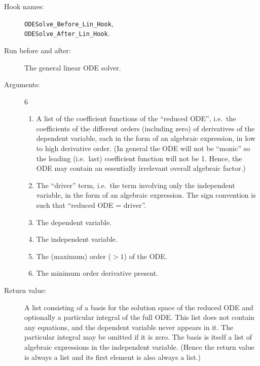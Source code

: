 \begin{description}
\item[Hook names:] \texttt{ODESolve\_Before\_Lin\_Hook},\\
\texttt{ODESolve\_After\_Lin\_Hook}.
\item[Run before and after:] The general linear ODE solver.
\item[Arguments:] 6
\begin{enumerate}
\item A list of the coefficient functions of the ``reduced ODE'',
i.e.\ the coefficients of the different orders (including zero) of
derivatives of the dependent variable, each in the form of an
algebraic expression, in low to high derivative order.  (In general
the ODE will not be ``monic'' so the leading (i.e.\ last) coefficient
function will not be 1.  Hence, the ODE may contain an essentially
irrelevant overall algebraic factor.)
\item The ``driver'' term, i.e.\ the term involving only the
independent variable, in the form of an algebraic expression.  The
sign convention is such that ``reduced ODE = driver''.
\item The dependent variable.
\item The independent variable.
\item The (maximum) order ($> 1$) of the ODE.
\item The minimum order derivative present.
\end{enumerate}
\item[Return value:] A list consisting of a basis for the solution
space of the reduced ODE and optionally a particular integral of the
full ODE\@.  This list does not contain any equations, and the dependent
variable never appears in it.  The particular integral may be omitted
if it is zero.  The basis is itself a list of algebraic expressions in
the independent variable.  (Hence the return value is always a list
and its first element is also always a list.)
\end{description}

\noindent\hrulefill

